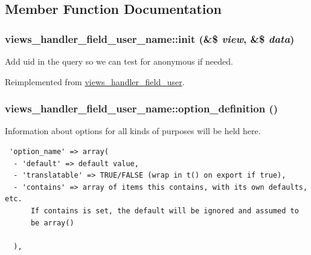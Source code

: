 \subsection{Member Function Documentation}
\hypertarget{classviews__handler__field__user__name_5879bbaa4a1e59f9509b9a5d6fbdd9b2}{
\subsubsection[{init}]{\setlength{\rightskip}{0pt plus 5cm}views\_\-handler\_\-field\_\-user\_\-name::init (\&\$ {\em view}, \/  \&\$ {\em data})}}
\label{classviews__handler__field__user__name_5879bbaa4a1e59f9509b9a5d6fbdd9b2}


Add uid in the query so we can test for anonymous if needed. 

Reimplemented from \hyperlink{classviews__handler__field__user_94156733dfddeb57dbd856e0f574cde6}{views\_\-handler\_\-field\_\-user}.\hypertarget{classviews__handler__field__user__name_11092f8f1854e14f245b644a2fed8434}{
\subsubsection[{option\_\-definition}]{\setlength{\rightskip}{0pt plus 5cm}views\_\-handler\_\-field\_\-user\_\-name::option\_\-definition ()}}
\label{classviews__handler__field__user__name_11092f8f1854e14f245b644a2fed8434}


Information about options for all kinds of purposes will be held here. 

\begin{Code}\begin{verbatim} 'option_name' => array(
  - 'default' => default value,
  - 'translatable' => TRUE/FALSE (wrap in t() on export if true),
  - 'contains' => array of items this contains, with its own defaults, etc.
      If contains is set, the default will be ignored and assumed to
      be array()

  ),
\end{verbatim}
\end{Code}

